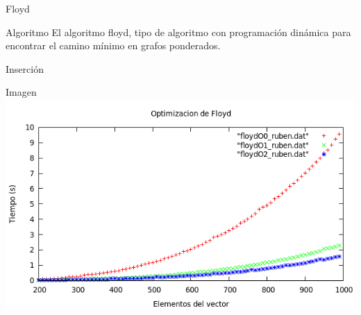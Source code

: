 \documentclass[compress]{beamer}
\begin{document}
\begin{frame}{Floyd}
	\begin{block}{Algoritmo}
	El algoritmo floyd, tipo de algoritmo con programación dinámica para encontrar el 			camino mínimo en grafos ponderados.
	\end{block}
\end{frame}

\begin{frame}{Inserción}
	\begin{alertblock}{Imagen}
	\includegraphics[scale=0.55]{../Graficas/Floyd/floyd_optimizacion.png}
	\end{alertblock}
\end{frame}



\end{document}
